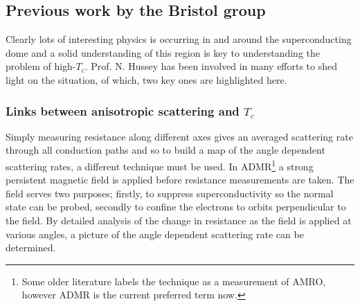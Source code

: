 \subsection{Previous work by the Bristol group}

Clearly lots of interesting physics is occurring in and around the superconducting dome and a solid understanding of this region is key to understanding the problem of high-$T_c$. Prof. N. Hussey has been involved in many efforts to shed light on the situation, of which, two key ones are highlighted here.

\subsubsection{Links between anisotropic scattering and $T_c$}
    \label{Sec:Intro:AnisotropicScattering}

Simply measuring resistance along different axes gives an averaged scattering rate through all conduction paths and so to build a map of the angle dependent scattering rates, a different technique must be used. In \ac{ADMR}\footnote{Some older literature labels the technique as a measurement of \ac{AMRO}, however \ac{ADMR} is the current preferred term now.} a strong persistent magnetic field is applied before resistance measurements are taken. The field serves two purposes; firstly, to suppress superconductivity so the normal state can be probed, secondly to confine the electrons to orbits perpendicular to the field. By detailed analysis of the change in resistance as the field is applied at various angles, a picture of the angle dependent scattering rate can be determined.

